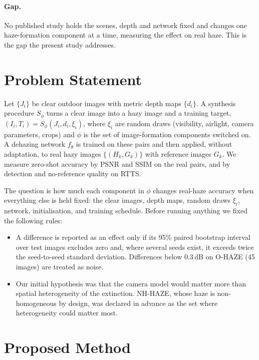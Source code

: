 \documentclass{article}
\begin{document}
\paragraph{Gap.} No published study holds the scenes, depth and network fixed and changes one haze-formation component at a time, measuring the effect on real haze. This is the gap the present study addresses.

\section{Problem Statement}
\label{sec:problem}

Let $\{J_i\}$ be clear outdoor images with metric depth maps $\{d_i\}$. A synthesis procedure $S_\phi$ turns a clear image into a hazy image and a training target, $(I_i, T_i) = S_\phi(J_i, d_i, \xi_i)$, where $\xi_i$ are random draws (visibility, airlight, camera parameters, crops) and $\phi$ is the set of image-formation components switched on. A dehazing network $f_\theta$ is trained on these pairs and then applied, without adaptation, to real hazy images $\{(H_k, G_k)\}$ with reference images $G_k$. We measure zero-shot accuracy by PSNR and SSIM on the real pairs, and by detection and no-reference quality on RTTS.

The question is how much each component in $\phi$ changes real-haze accuracy when everything else is held fixed: the clear images, depth maps, random draws $\xi_i$, network, initialisation, and training schedule. Before running anything we fixed the following rules:
\begin{itemize}
\item A difference is reported as an effect only if its 95\% paired bootstrap interval over test images excludes zero and, where several seeds exist, it exceeds twice the seed-to-seed standard deviation. Differences below 0.3\,dB on O-HAZE (45 images) are treated as noise.
\item Our initial hypothesis was that the camera model would matter more than spatial heterogeneity of the extinction. NH-HAZE, whose haze is non-homogeneous by design, was declared in advance as the set where heterogeneity could matter most.
\end{itemize}

\section{Proposed Method}
\label{sec:method}
\end{document}

